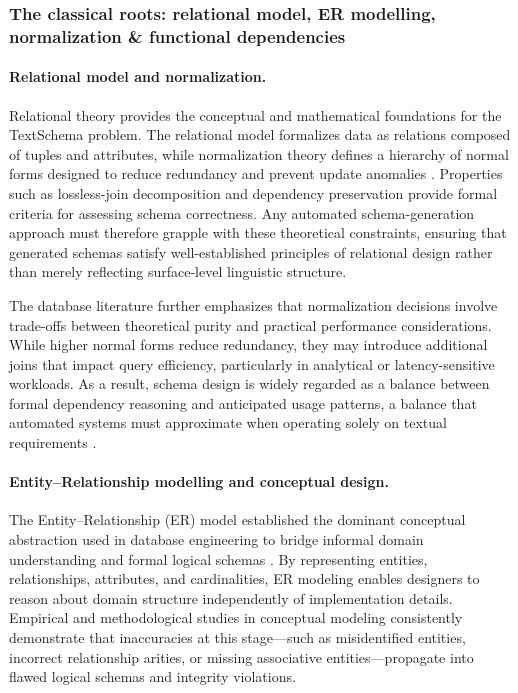 \subsubsection{The classical roots: relational model, ER modelling, normalization \& functional dependencies}

\paragraph{Relational model and normalization.}
Relational theory provides the conceptual and mathematical foundations for the Text\textrightarrow Schema problem. The relational model formalizes data as relations composed of tuples and attributes, while normalization theory defines a hierarchy of normal forms designed to reduce redundancy and prevent update anomalies \cite{codd1970}. Properties such as lossless-join decomposition and dependency preservation provide formal criteria for assessing schema correctness. Any automated schema-generation approach must therefore grapple with these theoretical constraints, ensuring that generated schemas satisfy well-established principles of relational design rather than merely reflecting surface-level linguistic structure.

The database literature further emphasizes that normalization decisions involve trade-offs between theoretical purity and practical performance considerations. While higher normal forms reduce redundancy, they may introduce additional joins that impact query efficiency, particularly in analytical or latency-sensitive workloads. As a result, schema design is widely regarded as a balance between formal dependency reasoning and anticipated usage patterns, a balance that automated systems must approximate when operating solely on textual requirements \cite{DBaaS_Current_Issues_and_Its_Future}.

\paragraph{Entity--Relationship modelling and conceptual design.}
The Entity--Relationship (ER) model established the dominant conceptual abstraction used in database engineering to bridge informal domain understanding and formal logical schemas \cite{chen1976}. By representing entities, relationships, attributes, and cardinalities, ER modeling enables designers to reason about domain structure independently of implementation details. Empirical and methodological studies in conceptual modeling consistently demonstrate that inaccuracies at this stage—such as misidentified entities, incorrect relationship arities, or missing associative entities—propagate into flawed logical schemas and integrity violations.

